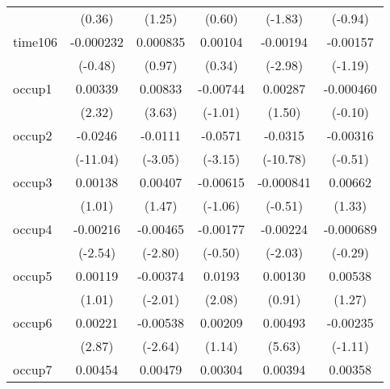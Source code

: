 \begin{table}[htbp]
\begin{tabular}{l*{5}{c}}
            &      (0.36)         &      (1.25)         &      (0.60)         &     (-1.83)         &     (-0.94)         \\
time106     &   -0.000232         &    0.000835         &     0.00104         &    -0.00194\sym{**} &    -0.00157         \\
            &     (-0.48)         &      (0.97)         &      (0.34)         &     (-2.98)         &     (-1.19)         \\
occup1      &     0.00339\sym{*}  &     0.00833\sym{***}&    -0.00744         &     0.00287         &   -0.000460         \\
            &      (2.32)         &      (3.63)         &     (-1.01)         &      (1.50)         &     (-0.10)         \\
occup2      &     -0.0246\sym{***}&     -0.0111\sym{**} &     -0.0571\sym{**} &     -0.0315\sym{***}&    -0.00316         \\
            &    (-11.04)         &     (-3.05)         &     (-3.15)         &    (-10.78)         &     (-0.51)         \\
occup3      &     0.00138         &     0.00407         &    -0.00615         &   -0.000841         &     0.00662         \\
            &      (1.01)         &      (1.47)         &     (-1.06)         &     (-0.51)         &      (1.33)         \\
occup4      &    -0.00216\sym{*}  &    -0.00465\sym{**} &    -0.00177         &    -0.00224\sym{*}  &   -0.000689         \\
            &     (-2.54)         &     (-2.80)         &     (-0.50)         &     (-2.03)         &     (-0.29)         \\
occup5      &     0.00119         &    -0.00374\sym{*}  &      0.0193\sym{*}  &     0.00130         &     0.00538         \\
            &      (1.01)         &     (-2.01)         &      (2.08)         &      (0.91)         &      (1.27)         \\
occup6      &     0.00221\sym{**} &    -0.00538\sym{**} &     0.00209         &     0.00493\sym{***}&    -0.00235         \\
            &      (2.87)         &     (-2.64)         &      (1.14)         &      (5.63)         &     (-1.11)         \\
occup7      &     0.00454\sym{***}&     0.00479\sym{*}  &     0.00304         &     0.00394\sym{*}  &     0.00358         \\

\end{tabular}
\end{table}
